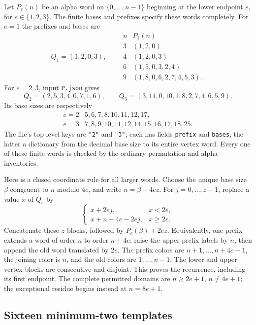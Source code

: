 Let $P_e(n)$ be an alpha word on $\{0,\ldots,n-1\}$ beginning at
the lower endpoint $e$, for $e\in\{1,2,3\}$.  The finite bases and
prefixes specify these words completely.  For $e=1$ the prefixes and
bases are
\[
 Q_1=(1,2,0,3),\qquad
 \begin{array}{c|l}
 n& P_1(n)\\\hline
 3&(1,2,0)\\
 4&(1,2,0,3)\\
 6&(1,5,0,3,2,4)\\
 9&(1,8,0,6,2,7,4,5,3).
 \end{array}
\]
For $e=2,3$, input \texttt{P.json} gives
\[
 Q_2=(2,5,3,4,0,7,1,6),\qquad
 Q_3=(3,11,0,10,1,8,2,7,4,6,5,9).
\]
Its base sizes are respectively
\[
 \begin{array}{c|l}
 e=2&5,6,7,8,10,11,12,17,\\
 e=3&7,8,9,10,11,12,14,15,16,17,18,25.
 \end{array}
\]
The file's top-level keys are \texttt{"2"} and \texttt{"3"}; each
has fields \texttt{prefix} and \texttt{bases}, the latter a dictionary
from the decimal base size to its entire vertex word.  Every one
of these finite words is checked by the ordinary permutation and
alpha inventories.

Here is a closed coordinate rule for all larger words.  Choose the
unique base size $\beta$ congruent to $n$ modulo $4e$, and write
$n=\beta+4ez$.  For $j=0,\ldots,z-1$, replace a value $x$ of
$Q_e$ by
\begin{equation}\label{templates:prefix-coordinate}
 \begin{cases}
 x+2ej,&x<2e,\\
 x+n-4e-2ej,&x\ge2e.
 \end{cases}
\end{equation}
Concatenate these $z$ blocks, followed by $P_e(\beta)+2ez$.
Equivalently, one prefix extends a word of order $n$ to order
$n+4e$: raise the upper prefix labels by $n$, then append the old
word translated by $2e$.  The prefix colors are
$n+1,\ldots,n+4e-1$, the joining color is $n$, and the old colors
are $1,\ldots,n-1$.  The lower and upper vertex blocks are
consecutive and disjoint.  This proves the recurrence, including
its first endpoint.  The complete permitted domains are
$n\ge2e+1$, $n\ne4e+1$; the exceptional residue begins instead at
$n=8e+1$.

\subsection{Sixteen minimum-two templates}
\label{templates:min2}

